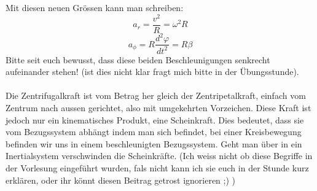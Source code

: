\documentclass[12pt]{article}
\begin{document}
Mit diesen neuen Grössen kann man schreiben:
\begin{equation}
a_r = \dfrac{v^2}{R} = \omega^2R
\end{equation}
\begin{equation}
a_{\phi} = R\dfrac{d^2\varphi}{dt^2} = R\beta
\end{equation}
Bitte seit euch bewusst, dass diese beiden Beschleunigungen senkrecht aufeinander stehen! (ist dies nicht klar fragt mich bitte in der Übungsstunde).\\
\\
Die Zentrifugalkraft ist vom Betrag her gleich der Zentripetalkraft, einfach vom Zentrum nach aussen gerichtet, also mit umgekehrten Vorzeichen. Diese Kraft ist jedoch nur ein kinematisches Produkt, eine Scheinkraft. Dies bedeutet, dass sie vom Bezugssystem abhängt indem man sich befindet, bei einer Kreisbewegung befinden wir uns in einem beschleunigten Bezugssystem. Geht man über in ein Inertialsystem verschwinden die Scheinkräfte. (Ich weiss nicht ob diese Begriffe in der Vorlesung eingeführt wurden, fals nicht kann ich sie euch in der Stunde kurz erklären, oder ihr könnt diesen Beitrag getrost ignorieren ;) )
\end{document}

